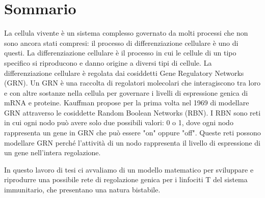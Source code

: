 \chapter*{Sommario}


La cellula vivente è un sistema complesso governato da molti processi che non sono ancora stati compresi: il processo di differenziazione cellulare è uno di questi.
La differenziazione cellulare è il processo in cui le cellule di un tipo specifico si riproducono e danno origine a diversi tipi di cellule.
La differenziazione cellulare è regolata dai cosiddetti Gene Regulatory Networks (GRN).
Un GRN è una raccolta di regolatori molecolari che interagiscono tra loro e con altre sostanze nella cellula per governare i livelli di espressione genica di mRNA e proteine.
Kauffman propose per la prima volta nel 1969 di modellare GRN attraverso le cosiddette Random Boolean Networks (RBN).
I RBN sono reti in cui ogni nodo può avere solo due possibili valori: 0 o 1, dove ogni nodo rappresenta un gene in GRN che può essere "on" oppure "off".
Queste reti possono modellare GRN perché l'attività di un nodo rappresenta il livello di espressione di un gene nell'intera regolazione.

In questo lavoro di tesi ci avvaliamo di un modello matematico per sviluppare e riprodurre una possibile rete di regolazione genica per i linfociti T del sistema immunitario, che presentano una natura bistabile.


